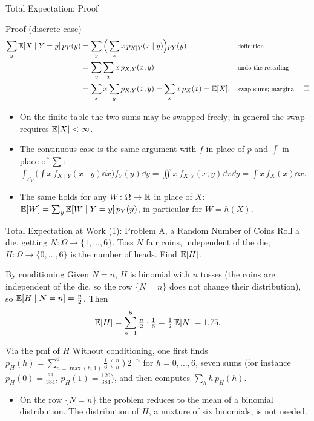 \begin{frame}{Total Expectation: Proof}
  \small
  \begin{block}{Proof (discrete case)}
    \begin{align*}
      \sum_y \mathbb{E}[X\mid Y=y]\,p_Y(y)
      &=\sum_y\Big(\sum_x x\,p_{X\mid Y}(x\mid y)\Big)p_Y(y) && \text{\footnotesize definition}\\
      &=\sum_y\sum_x x\,p_{X,Y}(x,y) && \text{\footnotesize undo the rescaling}\\
      &=\sum_x x\sum_y p_{X,Y}(x,y)=\sum_x x\,p_X(x)=\mathbb{E}[X]. && \text{\footnotesize swap sums; marginal}\quad\square
    \end{align*}
  \end{block}
  \begin{itemize}
    \item On the finite table the two sums may be swapped freely; in general the swap requires $\mathbb{E}|X|<\infty$.
    \item The continuous case is the same argument with $f$ in place of $p$ and $\int$ in place of $\sum$:
      $\int_{S_Y}\Big(\int x\,f_{X\mid Y}(x\mid y)\dd x\Big)f_Y(y)\dd y=\iint x\,f_{X,Y}(x,y)\dd x\dd y=\int x\,f_X(x)\dd x$.
    \item The same holds for any $W\colon\Omega\to\mathbb{R}$ in place of $X$: $\mathbb{E}[W]=\sum_y\mathbb{E}[W\mid Y=y]\,p_Y(y)$, in particular for $W=h(X)$.
  \end{itemize}
\end{frame}

\begin{frame}{Total Expectation at Work (1): Problem A, a Random Number of Coins}
  \small
  \label{coins}%
  Roll a die, getting $N\colon\Omega\to\{1,\dots,6\}$. Toss $N$ fair coins, independent of the die; $H\colon\Omega\to\{0,\dots,6\}$ is the number of heads. Find $\mathbb{E}[H]$.
  \begin{block}{By conditioning}
    Given $N=n$, $H$ is binomial with $n$ tosses (the coins are independent of the die, so the row $\{N=n\}$ does not change their distribution), so $\mathbb{E}[H\mid N=n]=\tfrac n2$. Then
    \[
      \mathbb{E}[H]=\sum_{n=1}^6\tfrac n2\cdot\tfrac16=\tfrac12\,\mathbb{E}[N]=1.75 .
    \]
  \end{block}
  \begin{block}{Via the pmf of $H$}
    Without conditioning, one first finds $p_H(h)=\sum_{n=\max(h,1)}^{6}\tfrac16\binom nh 2^{-n}$ for $h=0,\dots,6$, seven sums (for instance $p_H(0)=\tfrac{63}{384}$, $p_H(1)=\tfrac{120}{384}$), and then computes $\sum_h h\,p_H(h)$.
  \end{block}
  \begin{itemize}
    \item On the row $\{N=n\}$ the problem reduces to the mean of a binomial distribution. The distribution of $H$, a mixture of six binomials, is not needed.
  \end{itemize}
\end{frame}

